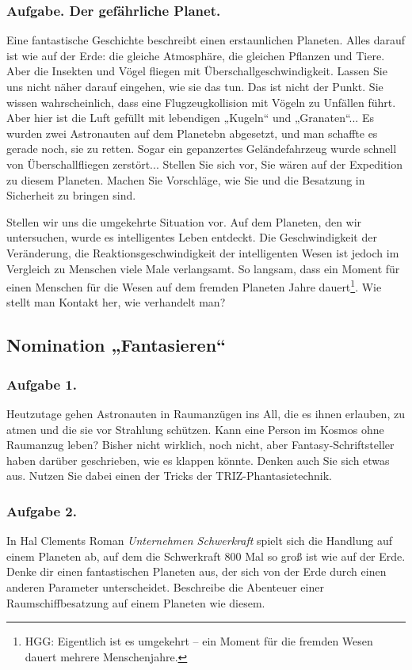 \documentclass[11pt,a4paper]{article}
\begin{document}
\subsubsection*{Aufgabe. Der gefährliche Planet.}
Eine fantastische Geschichte beschreibt einen erstaunlichen Planeten. Alles
darauf ist wie auf der Erde: die gleiche Atmosphäre, die gleichen Pflanzen und
Tiere. Aber die Insekten und Vögel fliegen mit Überschallgeschwindigkeit.
Lassen Sie uns nicht näher darauf eingehen, wie sie das tun.  Das ist nicht
der Punkt. Sie wissen wahrscheinlich, dass eine Flugzeugkollision mit Vögeln
zu Unfällen führt. Aber hier ist die Luft gefüllt mit lebendigen „Kugeln“ und
„Granaten“...  Es wurden zwei Astronauten auf dem Planetebn abgesetzt, und man
schaffte es gerade noch, sie zu retten. Sogar ein gepanzertes Geländefahrzeug
wurde schnell von Überschallfliegen zerstört...  Stellen Sie sich vor, Sie
wären auf der Expedition zu diesem Planeten. Machen Sie Vorschläge, wie Sie
und die Besatzung in Sicherheit zu bringen sind.

Stellen wir uns die umgekehrte Situation vor. Auf dem Planeten, den wir
untersuchen, wurde es intelligentes Leben entdeckt. Die Geschwindigkeit der
Veränderung, die Reaktionsgeschwindigkeit der intelligenten Wesen ist jedoch
im Vergleich zu Menschen viele Male verlangsamt. So langsam, dass ein Moment
für einen Menschen für die Wesen auf dem fremden Planeten Jahre
dauert\footnote{HGG: Eigentlich ist es umgekehrt -- ein Moment für die fremden
  Wesen dauert mehrere Menschenjahre.}. Wie stellt man Kontakt her, wie
verhandelt man?

\subsection{Nomination „Fantasieren“}

\subsubsection*{Aufgabe 1.}
Heutzutage gehen Astronauten in Raumanzügen ins All, die es ihnen erlauben, zu
atmen und die sie vor Strahlung schützen. Kann eine Person im Kosmos ohne
Raumanzug leben? Bisher nicht wirklich, noch nicht, aber
Fantasy-Schriftsteller haben darüber geschrieben, wie es klappen könnte.
Denken auch Sie sich etwas aus. Nutzen Sie dabei einen der Tricks der
TRIZ-Phantasietechnik.

\subsubsection*{Aufgabe 2.}
In Hal Clements Roman \emph{Unternehmen Schwerkraft} spielt sich die Handlung
auf einem Planeten ab, auf dem die Schwerkraft 800 Mal so groß ist wie auf der
Erde.  Denke dir einen fantastischen Planeten aus, der sich von der Erde durch
einen anderen Parameter unterscheidet. Beschreibe die Abenteuer einer
Raumschiffbesatzung auf einem Planeten wie diesem.
\end{document}

